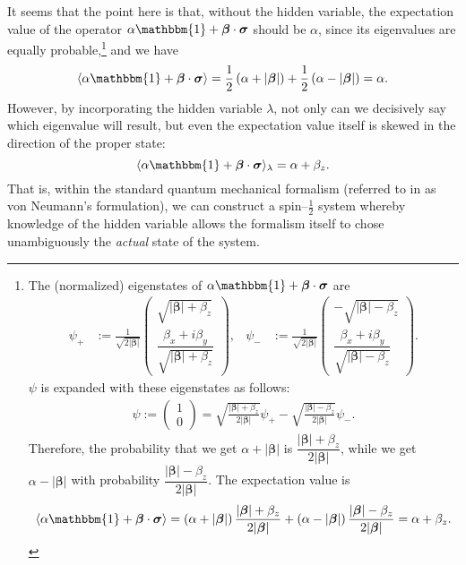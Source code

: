 \documentclass[12pt]{article}
\begin{document}
It seems that the point here is that, without the hidden variable, the expectation value of the operator $\alpha \mathbbm{1} + \bm{\beta} \cdot \bm{\sigma}$ should be $\alpha$, since its eigenvalues are equally probable,\footnote{The (normalized) eigenstates of $\alpha \mathbbm{1} +\boldsymbol{\beta}\cdot\boldsymbol{\sigma}$ are
\begin{align*}
  \psi_{+}
  &:= \frac{1}{\sqrt{2|\bm{\beta}|}}
  \begin{pmatrix}
    \sqrt{|\bm{\beta}|+\beta_z}\\
    \dfrac{\beta_x+i\beta_y}{\sqrt{|\bm{\beta}|+\beta_z}}
  \end{pmatrix},
  &
  \psi_{-}
  &:= \frac{1}{\sqrt{2|\bm{\beta}|}}
  \begin{pmatrix}
    -\sqrt{|\bm{\beta}|-\beta_z}\\
    \dfrac{\beta_x+i\beta_y}{\sqrt{|\bm{\beta}|-\beta_z}}
  \end{pmatrix}.
\end{align*}
$\psi$ is expanded with these eigenstates as follows:
\begin{align*}
  \psi
  :=
  \begin{pmatrix}
    1\\
    0
  \end{pmatrix}
  = \sqrt{\frac{|\bm{\beta}|+\beta_z}{2|\bm{\beta}|}}\psi_{+} - \sqrt{\frac{|\bm{\beta}|-\beta_z}{2|\bm{\beta}|}}\psi_{-}.
\end{align*}
Therefore, the probability that we get $\alpha+|\bm{\beta}|$ is $\dfrac{|\bm{\beta}|+\beta_z}{2|\bm{\beta}|}$, while we get $\alpha-|\bm{\beta}|$ with probability $\dfrac{|\bm{\beta}|-\beta_z}{2|\bm{\beta}|}$.
The expectation value is
\begin{align*}
  \langle \alpha \mathbbm{1} + \bm{\beta} \cdot \bm{\sigma} \rangle
  = \left( \alpha+|\bm{\beta}| \right) \dfrac{|\bm{\beta}|+\beta_z}{2|\bm{\beta}|} + \left( \alpha-|\bm{\beta}| \right) \dfrac{|\bm{\beta}|-\beta_z}{2|\bm{\beta}|}
  = \alpha + \beta_z.
\end{align*}
} 
and we have 
\begin{displaymath}
  \langle \alpha \mathbbm{1} + \bm{\beta} \cdot \bm{\sigma} \rangle
  = \frac{1}{2} \left( \alpha + |\bm{\beta}| \right) + \frac{1}{2} \left( \alpha - |\bm{\beta}| \right)
  = \alpha.
\end{displaymath}
However, by incorporating the hidden variable $\lambda$, not only can we decisively say which eigenvalue will result, but even the expectation value itself is skewed in the direction of the proper state:
\begin{displaymath}
  \langle \alpha \mathbbm{1} + \bm{\beta} \cdot \bm{\sigma} \rangle_{\lambda} = \alpha + \beta_z.
\end{displaymath}
That is, within the standard quantum mechanical formalism (referred to in \cite{Bell1966} as von Neumann's formulation), we can construct a spin--$\frac{1}{2}$ system whereby knowledge of the hidden variable allows the formalism itself to chose unambiguously the \emph{actual} state of the system.
\end{document}
